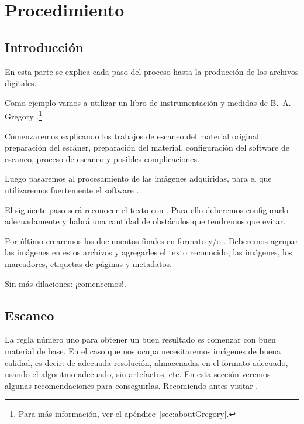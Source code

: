\documentclass[%
	a5paper,
	10pt,
	twoside,
	openright,
	final,
]{memoir}
\begin{document}
	\part{Procedimiento}

	\chapter{Introducción\label{sec:procedure}} En esta parte se explica cada paso del proceso hasta la producción de los archivos digitales.

	Como ejemplo vamos a utilizar un libro de instrumentación y medidas de B.~A. Gregory \cite{GregorySpringer}.\footnote{Para más información, ver el apéndice~\ref{sec:aboutGregory}.}

	Comenzaremos explicando los trabajos de escaneo del material original: preparación del escáner, preparación del material, configuración del software de escaneo, proceso de escaneo y posibles complicaciones.

	Luego pasaremos al procesamiento de las imágenes adquiridas, para el que utilizaremos fuertemente el software \scantailor.

	El siguiente paso será reconocer el texto con \abby. Para ello deberemos configurarlo adecuadamente y habrá una cantidad de obstáculos que tendremos que evitar.

	Por último crearemos los documentos finales en formato \pdf y/o \djvu. Deberemos agrupar las imágenes en estos archivos y agregarles el texto reconocido, las imágenes, los marcadores, etiquetas de páginas y metadatos.

	Sin más dilaciones: ¡comencemos!.

	\chapter{Escaneo\label{sec:scanning}} La regla número uno para obtener un buen resultado es comenzar con buen material de base. En el caso que nos ocupa necesitaremos imágenes de buena calidad, es decir: de adecuada resolución, almacenadas en el formato adecuado, usando el algoritmo adecuado, sin artefactos, etc. En esta sección veremos algunas recomendaciones para conseguirlas. Recomiendo antes visitar \cite{ScanTips}.
\end{document}
